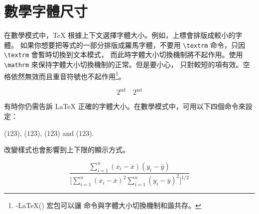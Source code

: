 \section{數學字體尺寸}\label{sec:fontsz}
在數學模式中，\TeX{} 根據上下文選擇字體大小。例如，上標會排版成較小的字體。
如果你想要把等式的一部分排版成羅馬字體，不要用 \verb|\textrm| 命令，只因 \verb|\textrm| 會暫時切換到文本模式，
而此時字體大小切換機制將不起作用。使用 \verb|\mathrm| 來保持字體大小切換機制的正常。但是要小心， 
只對較短的項有效。空格依然無效而且重音符號也不起作用\footnote{\AmS-\LaTeX{}() 宏包可以讓  命令與字體大小切換機制和諧共存。}。




\begin{example}
\begin{equation}
2^{\textrm{nd}} \quad
2^{\mathrm{nd}}
\end{equation}
\end{example}

有時你仍需告訴 \LaTeX{} 正確的字體大小。在數學模式中，可用以下四個命令來設定：
\begin{flushleft}
 ($\displaystyle 123$),
  ($\textstyle 123$),
 ($\scriptstyle 123$) and
 ($\scriptscriptstyle 123$).
\end{flushleft}

改變樣式也會影響到上下限的顯示方式。
\begin{example}
\begin{displaymath}
 \frac{\displaystyle
   \sum_{i=1}^n(x_i-\overline x)
   (y_i-\overline y)}
  {\displaystyle\biggl[
 \sum_{i=1}^n(x_i-\overline x)^2
\sum_{i=1}^n(y_i-\overline y)^2
\biggr]^{1/2}}
\end{displaymath}
\end{example}


